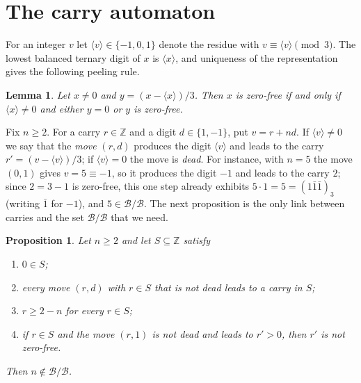 \documentclass[11pt]{amsart}
\newtheorem{proposition}[theorem]{Proposition}
\newtheorem{lemma}[theorem]{Lemma}
\theoremstyle{definition}
\newcommand{\bal}[1]{\langle #1\rangle}
\newcommand{\B}{\mathcal{B}}
\newcommand{\Z}{\mathbb{Z}}
\begin{document}
\section{The carry automaton}\label{sec:auto}

For an integer $v$ let $\bal v\in\{-1,0,1\}$ denote the residue with $v\equiv\bal v\pmod 3$. The
lowest balanced ternary digit of $x$ is $\bal x$, and uniqueness of the representation gives the
following peeling rule.

\begin{lemma}\label{lem:peel}
Let $x\ne 0$ and $y=(x-\bal x)/3$. Then $x$ is zero-free if and only if $\bal x\ne 0$ and either
$y=0$ or $y$ is zero-free.
\end{lemma}

Fix $n\ge 2$. For a carry $r\in\Z$ and a digit $d\in\{1,-1\}$, put $v=r+nd$. If $\bal v\ne 0$ we
say that the \emph{move} $(r,d)$ produces the digit $\bal v$ and leads to the carry
$r'=(v-\bal v)/3$; if $\bal v=0$ the move is \emph{dead}. For instance, with $n=5$ the move $(0,1)$ gives $v=5\equiv-1$, so it produces the digit $-1$ and leads to the carry $2$; since $2=3-1$ is zero-free, this one step already exhibits $5\cdot1=5=(1\bar1\bar1)_3$ (writing $\bar1$ for $-1$), and $5\in\B/\B$. The next proposition is the only link between
carries and the set $\B/\B$ that we need.

\begin{proposition}\label{prop:criterion}
Let $n\ge 2$ and let $S\subseteq\Z$ satisfy
\begin{enumerate}
\item[(i)] $0\in S$;
\item[(ii)] every move $(r,d)$ with $r\in S$ that is not dead leads to a carry in $S$;
\item[(iii)] $r\ge 2-n$ for every $r\in S$;
\item[(iv)] if $r\in S$ and the move $(r,1)$ is not dead and leads to $r'>0$, then $r'$ is not
zero-free.
\end{enumerate}
Then $n\notin\B/\B$.
\end{proposition}
\end{document}
